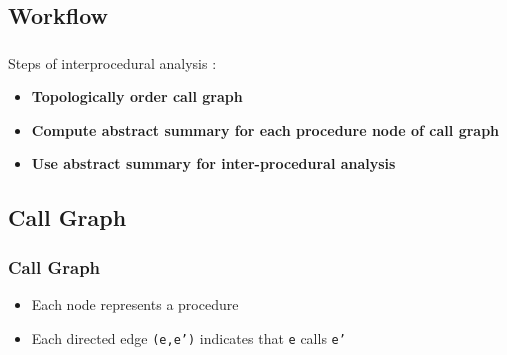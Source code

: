 \documentclass{beamer}
\begin{document}
\subsection{Workflow}
\frame
{	
	\frametitle{\subsecname}
	Steps of interprocedural analysis : 
	\newline
	\begin{itemize}	
	\item \textbf{Topologically order call graph}
	\end{itemize}
	\begin{itemize}
	\item \textbf{Compute abstract summary for each procedure node of call graph}
	\end{itemize}
	\begin{itemize}
	\item \textbf{Use abstract summary for inter-procedural analysis}
	\end{itemize}
	
}
\subsection{Call Graph}
\frame
{
	\frametitle{Call Graph}
	\begin{itemize}
	\item Each node represents a procedure
	\item Each directed edge {\tt(e,e')} indicates that {\tt e} calls {\tt e'} 
	\end{itemize}
	\begin{figure}
  \begin{center}
  
  \end{center}
\end{figure}
}
\end{document}
